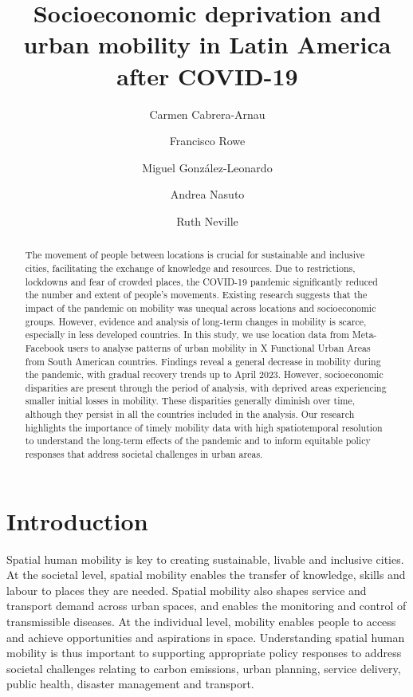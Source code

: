 \documentclass[
  11pt,
]{article}
\title{\textbf{Socioeconomic deprivation and urban mobility in Latin
America after COVID-19}}
\author[1]{Carmen Cabrera-Arnau}
\author[1]{Francisco Rowe}
\author[2]{Miguel González-Leonardo}
\author[1]{Andrea Nasuto}
\author[1]{Ruth Neville}
\affil[1]{Geographic Data Science Lab, Department of Geography and
Planning, University of Liverpool, Liverpool, UK}
\affil[2]{Centre for Demographic Urban and Environmental Studies, El
Colegio de México, Ciudad de México, México}
\date{}
\begin{document}
\maketitle
\begin{abstract}
The movement of people between locations is crucial for sustainable and
inclusive cities, facilitating the exchange of knowledge and resources.
Due to restrictions, lockdowns and fear of crowded places, the COVID-19
pandemic significantly reduced the number and extent of people's
movements. Existing research suggests that the impact of the pandemic on
mobility was unequal across locations and socioeconomic groups. However,
evidence and analysis of long-term changes in mobility is scarce,
especially in less developed countries. In this study, we use location
data from Meta-Facebook users to analyse patterns of urban mobility in X
Functional Urban Areas from South American countries. Findings reveal a
general decrease in mobility during the pandemic, with gradual recovery
trends up to April 2023. However, socioeconomic disparities are present
through the period of analysis, with deprived areas experiencing smaller
initial losses in mobility. These disparities generally diminish over
time, although they persist in all the countries included in the
analysis. Our research highlights the importance of timely mobility data
with high spatiotemporal resolution to understand the long-term effects
of the pandemic and to inform equitable policy responses that address
societal challenges in urban areas.
\end{abstract}

\section{Introduction}\label{sec-intro}

Spatial human mobility is key to creating sustainable, livable and
inclusive cities. At the societal level, spatial mobility enables the
transfer of knowledge, skills and labour to places they are needed.
Spatial mobility also shapes service and transport demand across urban
spaces, and enables the monitoring and control of transmissible
diseases. At the individual level, mobility enables people to access and
achieve opportunities and aspirations in space. Understanding spatial
human mobility is thus important to supporting appropriate policy
responses to address societal challenges relating to carbon emissions,
urban planning, service delivery, public health, disaster management and
transport.
\end{document}

